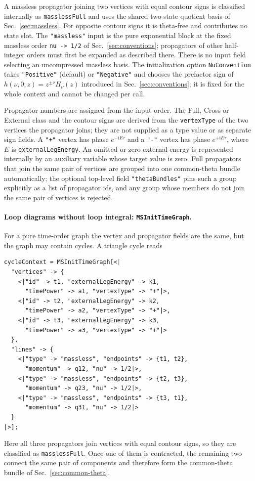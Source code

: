\documentclass[11pt,a4paper]{article}
\numberwithin{table}{section}
\newcommand{\ii}{\mathrm i}
\begin{document}
\FloatBarrier
A massless propagator joining two vertices with equal contour signs is classified internally as
\texttt{masslessFull} and uses the shared two-state quotient basis of Sec.~\ref{sec:massless}.
For opposite contour signs it is theta-free and contributes no state slot.
The \texttt{"massless"} input is the pure exponential block at the fixed massless order
\texttt{nu -> 1/2} of Sec.~\ref{sec:conventions}; propagators of other half-integer orders must
first be expanded as described there. There is no input field selecting an uncompressed massless basis.
The initialization option \texttt{NuConvention} takes \texttt{"Positive"} (default) or
\texttt{"Negative"} and chooses the prefactor sign of $h(\nu,0;z)=z^{\pm\nu}H_\nu(z)$ introduced in
Sec.~\ref{sec:conventions}; it is fixed for the whole context and cannot be changed per call.

Propagator numbers are assigned from the input order. The Full, Cross or External class and the contour signs are derived from the \texttt{vertexType} of the two vertices the propagator joins; they are not supplied as a type value or as separate sign fields. A \texttt{"+"} vertex has phase $e^{-\ii E\tau}$ and a \texttt{"-"} vertex has phase $e^{+\ii E\tau}$, where $E$ is \texttt{externalLegEnergy}. An omitted or zero external energy is represented internally by an auxiliary variable whose target value is zero. Full propagators that join the same pair of vertices are grouped into one common-theta bundle automatically; the optional top-level field \texttt{"thetaBundles"} pins such a group explicitly as a list of propagator ids, and any group whose members do not join the same pair of vertices is rejected.
\paragraph{Loop diagrams without loop integral: \texttt{MSInitTimeGraph}.}

For a pure time-order graph the vertex and propagator fields are the same, but the graph may contain
cycles. A triangle cycle reads
\begin{verbatim}
cycleContext = MSInitTimeGraph[<|
  "vertices" -> {
    <|"id" -> t1, "externalLegEnergy" -> k1,
      "timePower" -> a1, "vertexType" -> "+"|>,
    <|"id" -> t2, "externalLegEnergy" -> k2,
      "timePower" -> a2, "vertexType" -> "+"|>,
    <|"id" -> t3, "externalLegEnergy" -> k3,
      "timePower" -> a3, "vertexType" -> "+"|>
  },
  "lines" -> {
    <|"type" -> "massless", "endpoints" -> {t1, t2},
      "momentum" -> q12, "nu" -> 1/2|>,
    <|"type" -> "massless", "endpoints" -> {t2, t3},
      "momentum" -> q23, "nu" -> 1/2|>,
    <|"type" -> "massless", "endpoints" -> {t3, t1},
      "momentum" -> q31, "nu" -> 1/2|>
  }
|>];
\end{verbatim}
Here all three propagators join vertices with equal contour signs, so they are classified as
\texttt{masslessFull}. Once one of them is contracted, the remaining two connect the same pair of
components and therefore form the common-theta bundle of Sec.~\ref{sec:common-theta}.
\end{document}
